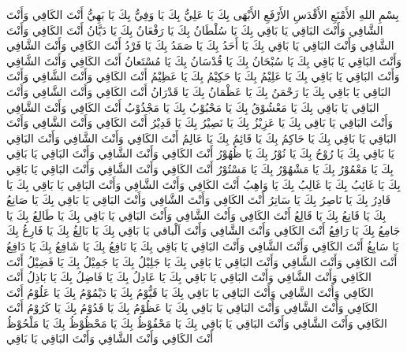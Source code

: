 بِسْمِ اللهِ الأَمْنَعِ الأَقْدَسِ الأَرْفَعِ الأَبْهَى
بِكَ يَا عَلِيُّ بِكَ يَا وَفِيُّ بِكَ يَا بَهِيُّ أَنْتَ الكَافِي وَأَنْتَ الشَّافِي وَأَنْتَ البَاقِي يَا بَاقِي
بِكَ يَا سُلْطَانُ بِكَ يَا رَفْعَانُ بِكَ يَا دَيَّانُ أَنْتَ الكَافِي وَأَنْتَ الشَّافِي وَأَنْتَ البَاقِي يَا بَاقِي
بِكَ يَا أَحَدُ بِكَ يَا صَمَدُ بِكَ يَا فَرْدُ أَنْتَ الكَافِي وَأَنْتَ الشَّافِي وَأَنْتَ البَاقِي يَا بَاقِي
بِكَ يَا سُبْحَانُ بِكَ يَا قُدْسَانُ بِكَ يَا مُسْتَعانُ أَنْتَ الكَافِي وَأَنْتَ الشَّافِي وَأَنْتَ البَاقِي يَا بَاقِي
بِكَ يَا عَلِيْمُ بِكَ يَا حَكِيْمُ بِكَ يَا عَظِيْمُ أَنْتَ الكَافِي وَأَنْتَ الشَّافِي وَأَنْتَ البَاقِي يَا بَاقِي
بِكَ يَا رَحْمَنُ بِكَ يَا عَظْمَانُ بِكَ يَا قَدْرَانُ أَنْتَ الكَافِي وَأَنْتَ الشَّافِي وَأَنْتَ البَاقِي يَا بَاقِي
بِكَ يَا مَعْشُوْقُ بِكَ يَا مَحْبُوْبُ بِكَ يَا مَجْذُوْبُ أَنْتَ الكَافِي وَأَنْتَ الشَّافِي وَأَنْتَ البَاقِي يَا بَاقِي
بِكَ يَا عَزِيْزُ بِكَ يَا نَصِيْرُ بِكَ يَا قَدِيْرُ أَنْتَ الكَافِي وَأَنْتَ الشَّافِي وَأَنْتَ البَاقِي يَا بَاقِي
بِكَ يَا حَاكِمُ بِكَ يَا قَائِمُ بِكَ يَا عَالِمُ أَنْتَ الكَافِي وَأَنْتَ الشَّافِي وَأَنْتَ البَاقِي يَا بَاقِي
بِكَ يَا رُوْحُ بِكَ يَا نُوْرُ بِكَ يَا ظُهُوْرُ أَنْتَ الكَافِي وَأَنْتَ الشَّافِي وَأَنْتَ البَاقِي يَا بَاقِي
بِكَ يَا مَعْمُوْرُ بِكَ يَا مَشْهُوْرُ بِكَ يَا مَسْتُوْرُ أَنْتَ الكَافِي وَأَنْتَ الشَّافِي وَأَنْتَ البَاقِي يَا بَاقِي
بِكَ يَا غَائِبُ بِكَ يَا غَالِبُ بِكَ يَا وَاهِبُ أَنْتَ الكَافِي وَأَنْتَ الشَّافِي وَأَنْتَ البَاقِي يَا بَاقِي
بِكَ يَا قَادِرُ بِكَ يَا نَاصِرُ بِكَ يَا سَاتِرُ أَنْتَ الكَافِي وَأَنْتَ الشَّافِي وَأَنْتَ البَاقِي يَا بَاقِي
بِكَ يَا صَانِعُ بِكَ يَا قَانِعُ بِكَ يَا قَالِعُ أَنْتَ الكَافِي وَأَنْتَ الشَّافِي وَأَنْتَ البَاقِي يَا بَاقِي
بِكَ يَا طَالِعُ بِكَ يَا جَامِعُ بِكَ يَا رَافِعُ أَنْتَ الكَافِي وَأَنْتَ الشَّافِي وَأَنْتَ اَلْباقي يَا بَاقِي
بِكَ يَا بَالِغُ بِكَ يَا فَارِغُ بِكَ يَا سَابِغُ أَنْتَ الكَافِي وَأَنْتَ الشَّافِي وَأَنْتَ البَاقِي يَا بَاقِي
بِكَ يَا نَافِعُ بِكَ يَا شَافِعُ بِكَ يَا دَافِعُ أَنْتَ الكَافِي وَأَنْتَ الشَّافِي وَأَنْتَ البَاقِي يَا بَاقِي
بِكَ يَا جَلِيْلُ بِكَ يَا جَمِيْلُ بِكَ يَا فَضِيْلُ أَنْتَ الكَافِي وَأَنْتَ الشَّافِي وَأَنْتَ البَاقِي يَا بَاقِي
بِكَ يَا عَادِلُ بِكَ يَا فَاضِلُ بِكَ يَا بَاذِلُ أَنْتَ الكَافِي وَأَنْتَ الشَّافِي وَأَنْتَ البَاقِي يَا بَاقِي
بِكَ يَا قَيُّوْمُ بِكَ يَا دَيْمُوْمُ بِكَ يَا عَلُوْمُ أَنْتَ الكَافِي وَأَنْتَ الشَّافِي وَأَنْتَ البَاقِي يَا بَاقِي
بِكَ يَا عَظُوْمُ بِكَ يَا قَدُوْمُ بِكَ يَا كَرُوْمُ أَنْتَ الكَافِي وَأَنْتَ الشَّافِي وَأَنْتَ البَاقِي يَا بَاقِي
بِكَ يَا مَحْفُوْظُ بِكَ يَا مَحْظُوْظُ بِكَ يَا مَلْحُوْظُ أَنْتَ الكَافِي وَأَنْتَ الشَّافِي وَأَنْتَ البَاقِي يَا بَاقِي
